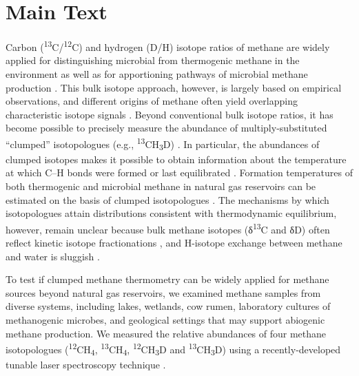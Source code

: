\clearpage

\section{Main Text} \label{main-text}


\noindent Carbon (\textsuperscript{13}C/\textsuperscript{12}C) and hydrogen (D/H)
isotope ratios of methane are widely applied for distinguishing
microbial from thermogenic methane in the environment \parencite{Baldassare++_2014_AAPGB,Flores++_2008_IJCG,Pohlman++_2009_EPSL,SherwoodLollar++_2008_GCA,SherwoodLollar++_2002_N,Welhan+Lupton_1987_AAPGB,Whiticar_1990_OG} as well as for apportioning pathways of microbial
methane production \parencite{Burke++_1988_N,McCalley++_2014_N,Whiticar++_1986_GCA}. This bulk isotope approach,
however, is largely based on empirical observations, and different
origins of methane often yield overlapping characteristic isotope
signals \parencite{Pohlman++_2009_EPSL,Whiticar_1990_OG,Etiope+SherwoodLollar_2013_RG,Schoell_1988_CG,Whiticar_1999_CG}. Beyond conventional
bulk isotope ratios, it has become possible to precisely measure the
abundance of multiply-substituted ``clumped'' isotopologues (e.g.,
\textsuperscript{13}CH\textsubscript{3}D) \parencite{Ono++_2014_AC,Stolper++_2014_GCA}. In
particular, the abundances of clumped isotopes makes it possible to obtain information
about the temperature at which C--H bonds were formed or last
equilibrated \parencite[][and \autoref{fig:2:S1}]{Ono++_2014_AC}. Formation temperatures
of both thermogenic and microbial methane in natural gas reservoirs can
be estimated on the basis of clumped isotopologues \parencite{Stolper++_2014_S}. The
mechanisms by which isotopologues attain distributions consistent with
thermodynamic equilibrium, however, remain unclear because bulk methane
isotopes (δ\textsuperscript{13}C and δD) often reflect kinetic isotope
fractionations \parencite{Whiticar_1999_CG,Valentine++_2004_GCA}, and H-isotope exchange between
methane and water is sluggish \parencite{Reeves++_2012_GCA}.

To test if clumped methane thermometry can be widely applied for methane
sources beyond natural gas reservoirs, we examined methane samples from
diverse systems, including lakes, wetlands, cow rumen, laboratory
cultures of methanogenic microbes, and geological settings that may
support abiogenic methane production. We measured the relative abundances of four methane
isotopologues (\textsuperscript{12}CH\textsubscript{4},
\textsuperscript{13}CH\textsubscript{4},
\textsuperscript{12}CH\textsubscript{3}D and
\textsuperscript{13}CH\textsubscript{3}D) using a recently-developed
tunable laser spectroscopy technique \parencite[][and \autoref{materials-and-methods}]{Ono++_2014_AC}.

